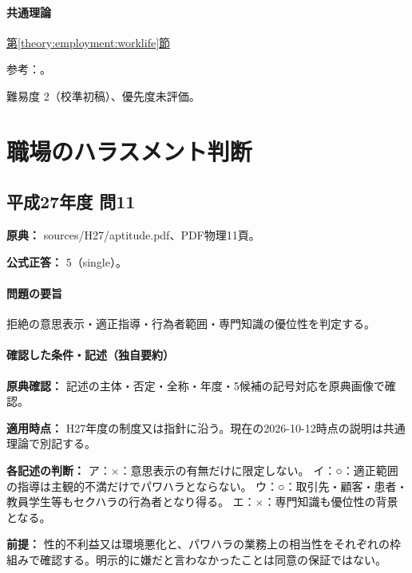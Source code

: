 \paragraph{共通理論} \hyperref[theory:employment:worklife]{第\ref*{theory:employment:worklife}節}

\par 参考：\cite{employment_worklife2010}。

\par 難易度 2（校準初稿）、優先度未評価。

\section{職場のハラスメント判断}

\subsection{平成27年度 問11}
\label{q:h27-reg-apt-11}

\noindent\textbf{原典：} sources/H27/aptitude.pdf、PDF物理11頁。

\textbf{公式正答：} 5（single）。

\paragraph{問題の要旨} 拒絶の意思表示・適正指導・行為者範囲・専門知識の優位性を判定する。

\paragraph{確認した条件・記述（独自要約）}\mbox{}\par

\noindent\textbf{原典確認：} 記述の主体・否定・全称・年度・5候補の記号対応を原典画像で確認。\par

\noindent\textbf{適用時点：} H27年度の制度又は指針に沿う。現在の2026-10-12時点の説明は共通理論で別記する。\par

\noindent\textbf{各記述の判断：} ア：×：意思表示の有無だけに限定しない。 イ：○：適正範囲の指導は主観的不満だけでパワハラとならない。 ウ：○：取引先・顧客・患者・教員学生等もセクハラの行為者となり得る。 エ：×：専門知識も優位性の背景となる。\par

\noindent\textbf{前提：} 性的不利益又は環境悪化と、パワハラの業務上の相当性をそれぞれの枠組みで確認する。明示的に嫌だと言わなかったことは同意の保証ではない。\par

